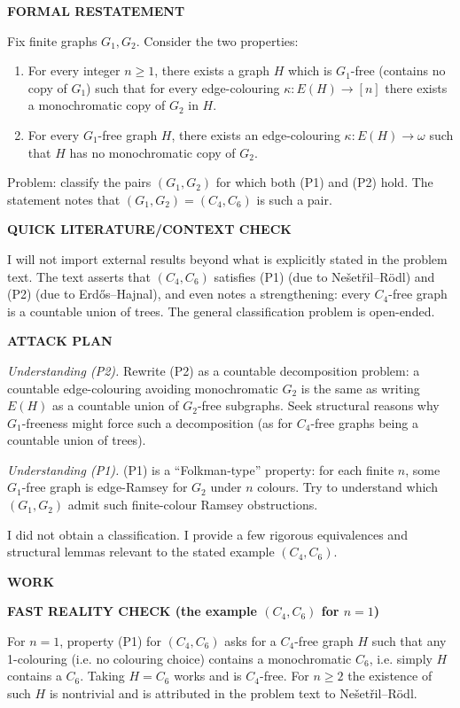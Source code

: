 \bigskip
\noindent\textbf{FORMAL RESTATEMENT}

Fix finite graphs $G_1,G_2$.
Consider the two properties:
\begin{enumerate}
\item[(P1)] For every integer $n\ge 1$, there exists a graph $H$ which is $G_1$-free (contains no copy of $G_1$) such that for every edge-colouring $\kappa:E(H)\to[n]$ there exists a monochromatic copy of $G_2$ in $H$.
\item[(P2)] For every $G_1$-free graph $H$, there exists an edge-colouring $\kappa:E(H)\to\omega$ such that $H$ has no monochromatic copy of $G_2$.
\end{enumerate}

Problem: classify the pairs $(G_1,G_2)$ for which both (P1) and (P2) hold.
The statement notes that $(G_1,G_2)=(C_4,C_6)$ is such a pair.

\bigskip
\noindent\textbf{QUICK LITERATURE/CONTEXT CHECK}

I will not import external results beyond what is explicitly stated in the problem text.
The text asserts that $(C_4,C_6)$ satisfies (P1) (due to Ne\v{s}et\v{r}il--R\"{o}dl) and (P2) (due to Erd\H{o}s--Hajnal), and even notes a strengthening: every $C_4$-free graph is a countable union of trees.
The general classification problem is open-ended.

\bigskip
\noindent\textbf{ATTACK PLAN}

\emph{Understanding (P2).}
Rewrite (P2) as a countable decomposition problem: a countable edge-colouring avoiding monochromatic $G_2$ is the same as writing $E(H)$ as a countable union of $G_2$-free subgraphs.
Seek structural reasons why $G_1$-freeness might force such a decomposition (as for $C_4$-free graphs being a countable union of trees).

\emph{Understanding (P1).}
(P1) is a ``Folkman-type'' property: for each finite $n$, some $G_1$-free graph is edge-Ramsey for $G_2$ under $n$ colours.
Try to understand which $(G_1,G_2)$ admit such finite-colour Ramsey obstructions.

I did not obtain a classification. I provide a few rigorous equivalences and structural lemmas relevant to the stated example $(C_4,C_6)$.

\bigskip
\noindent\textbf{WORK}

\medskip
\noindent\textbf{FAST REALITY CHECK (the example $(C_4,C_6)$ for $n=1$)}

For $n=1$, property (P1) for $(C_4,C_6)$ asks for a $C_4$-free graph $H$ such that any 1-colouring (i.e. no colouring choice) contains a monochromatic $C_6$, i.e. simply $H$ contains a $C_6$.
Taking $H=C_6$ works and is $C_4$-free.
For $n\ge 2$ the existence of such $H$ is nontrivial and is attributed in the problem text to Ne\v{s}et\v{r}il--R\"{o}dl.

